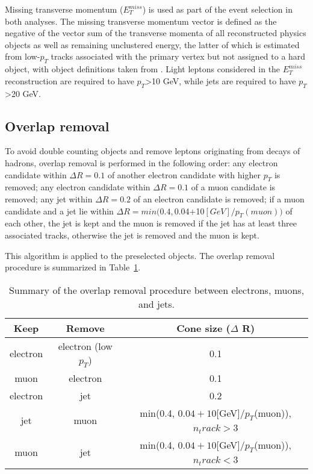 Missing transverse momentum ($E_T^{miss}$) is used as part of the event selection in both analyses. The missing transverse momentum vector is defined as the negative of the vector sum of the transverse momenta of all reconstructed physics objects as well as remaining unclustered energy, the latter of which is estimated from low-$p_T$ tracks associated with the primary vertex but not assigned to a hard object, with object definitions taken from \cite{met_2018}. Light leptons considered in the $E_T^{miss}$ reconstruction are required to have $p_T$>10 GeV, while jets are required to have $p_T$>20 GeV.

\subsection{Overlap removal}
\label{subsec:overlapremoval}

To avoid double counting objects and remove leptons originating from decays of hadrons, overlap removal is performed in the following order: any electron candidate within $\Delta R = 0.1$ of another electron candidate with higher $p_T$ is removed; any electron candidate within $\Delta R = 0.1$ of a muon candidate is removed; any jet within $\Delta R = 0.2$ of an electron candidate is removed; if a muon candidate and a jet lie within $\Delta R = min(0.4, $0.04+10$[GeV]/p_T(muon))$ of each other, the jet is kept and the muon is removed if the jet has at least three associated tracks, otherwise the jet is removed and the muon is kept.

This algorithm is applied to the preselected objects. The overlap removal procedure is summarized in Table~\ref{tab:overlap-removal}. 

\begin{table}[h!]
 \begin{center}
   \begin{tabular}{|c|c|c|}
     \hline
                            \textbf{Keep}  &  \textbf{Remove} & \textbf{Cone size ($\Delta$ R)}  \\
         \hline
                        electron        & electron (low $p_T$)    & 0.1 \\
     \hline
                        muon    & electron      & 0.1 \\
     \hline
                            electron    & jet   & 0.2 \\
         \hline
                        jet             & muon  & min(0.4, $0.04+10$[GeV]/$p_T$(muon)), $n_track>$3 \\
         \hline muon             & jet  & min(0.4, $0.04+10$[GeV]/$p_T$(muon)), $n_track<$3 \\
     \hline
   \end{tabular}
   \caption{\label{tab:overlap-removal} Summary of the overlap removal procedure between electrons, muons, and jets.}
 \end{center}
\end{table}
